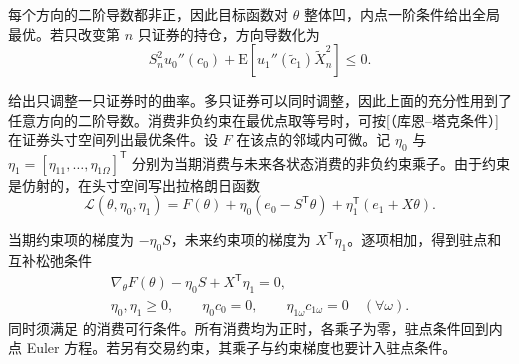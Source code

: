 每个方向的二阶导数都非正，因此目标函数对 $\theta$ 整体凹，内点一阶条件给出全局最优。若只改变第 $n$ 只证券的持仓，方向导数化为
\begin{equation}
 S_n^2u_0''(c_0)+\mathrm E[u_1''(\tilde c_1)\widetilde X_n^2]\le0.\label{eq:wj-8-4}
\end{equation}

 给出只调整一只证券时的曲率。多只证券可以同时调整，因此上面的充分性用到了任意方向的二阶导数。消费非负约束在最优点取等号时，可按[（库恩--塔克条件）]在证券头寸空间列出最优条件。设 $F$ 在该点的邻域内可微。记 $\eta_0$ 与 $\eta_1=[\eta_{11},\ldots,\eta_{1\Omega}]^{\mathsf T}$ 分别为当期消费与未来各状态消费的非负约束乘子。由于约束是仿射的，在头寸空间写出拉格朗日函数
\[
 \mathcal L(\theta,\eta_0,\eta_1)
 =F(\theta)+\eta_0(e_0-S^{\mathsf T}\theta)
 +\eta_1^{\mathsf T}(e_1+X\theta).
\]

当期约束项的梯度为 $-\eta_0S$，未来约束项的梯度为 $X^{\mathsf T}\eta_1$。逐项相加，得到驻点和互补松弛条件
\[
 \begin{gathered}
 \nabla_\theta F(\theta)-\eta_0 S+X^{\mathsf T}\eta_1=0,\\
 \eta_0,\eta_1\ge0,\qquad \eta_0 c_0=0,\qquad
 \eta_{1\omega}c_{1\omega}=0\quad(\forall\omega).
 \end{gathered}
\]
同时须满足 的消费可行条件。所有消费均为正时，各乘子为零，驻点条件回到内点 Euler 方程。若另有交易约束，其乘子与约束梯度也要计入驻点条件。
